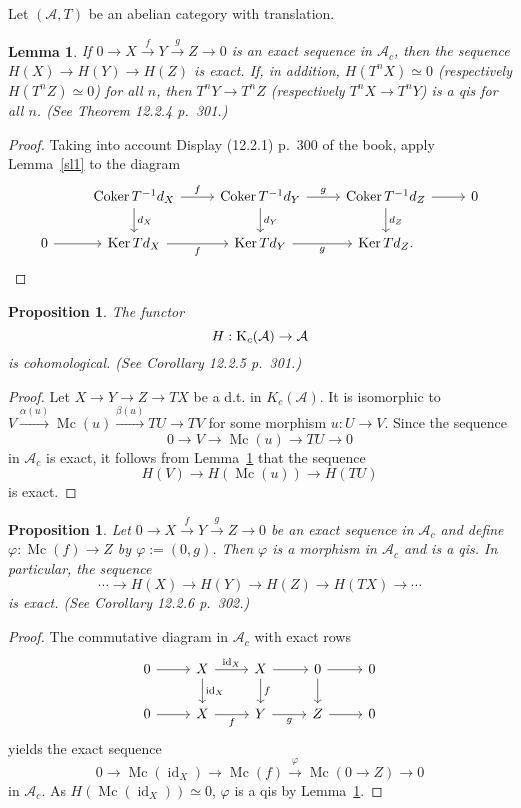 \documentclass[12pt]{article}
\newtheorem{lem}[thm]{Lemma}
\newtheorem{prop}[thm]{Proposition}
\theoremstyle{remark}
\theoremstyle{definition}
\newcommand{\A}{\mathcal A}
\newcommand{\xr}{\xrightarrow}
\DeclareMathOperator{\Coker}{Coker}
\DeclareMathOperator{\id}{id}
\DeclareMathOperator{\Ker}{Ker}
\DeclareMathOperator{\Mc}{Mc}
\begin{document}
Let $(\A,T)$ be an abelian category with translation. 
%
\begin{lem}\label{sl2}
If $0\to X\xr fY\xr g Z\to0$ is an exact sequence in $\A_c$, then the sequence $H(X)\to H(Y)\to H(Z)$ is exact. If, in addition, $H(T^nX)\simeq0$ (respectively $H(T^nZ)\simeq0$) for all $n$, then $T^nY\to T^nZ$ (respectively $T^nX\to T^nY$) is a qis for all $n$. (See Theorem 12.2.4 p.~301.)
\end{lem}
%
\begin{proof}
Taking into account Display (12.2.1) p.~300 of the book, apply Lemma~\ref{sl1} to the diagram 
$$
\begin{tikzcd}
{}&\Coker T^{-1}d_X\ar{d}{d_X}\ar{r}{f}&\Coker T^{-1}d_Y\ar{d}{d_Y}\ar{r}{g}&\Coker T^{-1}d_Z\ar{d}{d_Z}\ar{r}&0\\ 
0\ar{r}&\Ker Td_X\ar{r}[swap]{f}&\Ker Td_Y\ar{r}[swap]{g}&\Ker Td_Z.
\end{tikzcd}
$$ 
\end{proof}
%
\begin{prop}\label{sl3}
The functor 
$$
H:\text K_c(\A)\to\A
$$ 
is cohomological. (See Corollary 12.2.5 p.~301.) 
\end{prop}
%
\begin{proof}
Let $X\to Y\to Z\to TX$ be a d.t. in $K_c(\A)$. It is isomorphic to $V\xr{\alpha(u)}\Mc(u)\xr{\beta(u)}TU\to TV$ for some morphism $u:U\to V$. Since the sequence 
$$
0\to V\to\Mc(u)\to TU\to0
$$ 
in $\A_c$ is exact, it follows from Lemma~\ref{sl2} that the sequence 
$$ 
H(V)\to H(\Mc(u))\to H(TU)
$$ 
is exact.
\end{proof}
%
\begin{prop}\label{sl4}
Let $0\to X\xr f Y\xr g Z\to0$ be an exact sequence in $\A_c$ and define $\varphi:\Mc(f)\to Z$ by $\varphi:=(0,g)$. Then $\varphi$ is a morphism in $\A_c$ and is a qis. In particular, the sequence 
$$
\cdots\to H(X)\to H(Y)\to H(Z)\to H(TX)\to\cdots
$$
is exact. (See Corollary 12.2.6 p.~302.)
\end{prop}
%
\begin{proof}
The commutative diagram in $\A_c$ with exact rows 
$$
\begin{tikzcd}
0\ar{r}&X\ar{d}{\id_X}\ar{r}{\id_X}&X\ar{d}{f}\ar{r}&0\ar{d}\ar{r}&0\\ 
0\ar{r}&X\ar{r}[swap]{f}&Y\ar{r}[swap]{g}&Z\ar{r}&0
\end{tikzcd}
$$ 
yields the exact sequence 
$$
0\to\Mc(\id_X)\to\Mc(f)\xr\varphi\Mc(0\to Z)\to0
$$
in $\A_c$. As $H(\Mc(\id_X))\simeq0$, $\varphi$ is a qis by Lemma~\ref{sl2}.
\end{proof}
%
%
\end{document}
